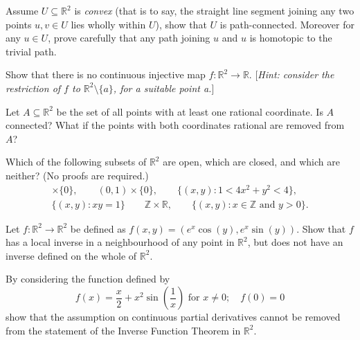 \documentclass[answers]{exam}
\begin{document}
\begin{questions}
\question%
Assume $U \subseteq \mathbb R^2$ is \emph{convex} (that is to say, the straight line segment joining any two points $u, v \in U$ lies wholly within $U$), show that $U$ is path-connected. Moreover for any $u \in U$, prove carefully that any path joining $u$ and $u$ is homotopic to the trivial path.



\question%
Show that there is no continuous injective map $f: \mathbb R^2 \to \mathbb R$. [\emph{Hint: consider the restriction of $f$ to $\mathbb R^2 \setminus\{a\}$, for a suitable point a.}]



\question%
Let $A \subseteq \mathbb R^2$ be the set of all points with at least one rational coordinate. Is $A$ connected? What if the points with both coordinates rational are removed from $A$?



\question%
Which of the following subsets of $\mathbb R^2$ are open, which are closed, and which are neither? (No proofs are required.) \begin{gather*}
	[0,1]\times\{0\},\qquad
	(0,1)\times\{0\},\qquad
	\{(x,y):1<4x^2+y^2<4\},\\
	\{(x, y): x y=1\}\qquad
	\mathbb Z\times\mathbb R,\qquad
	\{(x,y): x \in \mathbb Z \text{ and } y>0\}.
\end{gather*}



\question%
Let $f: \mathbb R^2 \to \mathbb R^2$ be defined as $f(x, y)=(e^{x} \cos (y), e^{x} \sin (y))$. Show that $f$ has a local inverse in a neighbourhood of any point in $\mathbb R^2$, but does not have an inverse defined on the whole of $\mathbb R^2$.



\question%
By considering the function defined by \[
	f(x)=\frac x2+x^2 \sin \left(\frac1x\right)\text{ for }x\neq0;\quad
	f(0)=0
\] show that the assumption on continuous partial derivatives cannot be removed from the statement of the Inverse Function Theorem in $\mathbb R^2$.

\end{questions}
\end{document}
